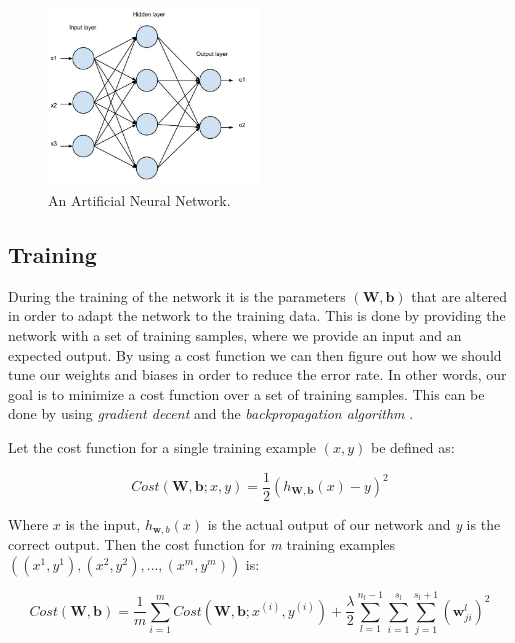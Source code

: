 \begin{figure}[h!]
  \centering
      \includegraphics[width=0.5\textwidth]{Figures/Background/ann}
  \caption{An Artificial Neural Network.}
\end{figure}


\subsection{Training} \label{sec_ann_training}
During the training of the network it is the parameters $ (\mathbf{W, b}) $ that are altered in order to adapt the network to the training data. This is done by providing the network with a set of training samples, where we provide an input and an expected output. By using a cost function we can then figure out how we should tune our weights and biases in order to reduce the error rate. In other words, our goal is to minimize a cost function over a set of training samples. This can be done by using \textit{gradient decent} and the \textit{backpropagation algorithm} \cite{Rumelhart1986}\cite{Leonard1990}\cite{LeCun1998}. 

Let the cost function for a single training example $(x,y)$ be defined as:

\begin{equation}
	Cost(\mathbf{W},\mathbf{b}; x, y) = \frac{1}{2}(h_{\mathbf{W},\mathbf{b}}(x) - y)^2
\end{equation}

Where $ x $ is the input, $ h_{\mathbf{w},b}(x) $ is the actual output of our network and \textit{y} is the correct output.
Then the cost function for \textit{m} training examples $ ((x^{1}, y^{1}), (x^{2}, y^{2}), \dots, (x^{m}, y^{m})) $ is:

\begin{equation}
	Cost(\mathbf{W},\mathbf{b}) = \frac{1}{m}\sum_{i=1}^{m}Cost(\mathbf{W},\mathbf{b};x^{(i)},y^{(i)}) + \frac{\lambda}{2}
	\sum_{l=1}^{n_l-1}\sum_{i=1}^{s_l}\sum_{j=1}^{s_l+1}
	(\mathbf{w}_{ji}^{l})^2
\end{equation}
 
